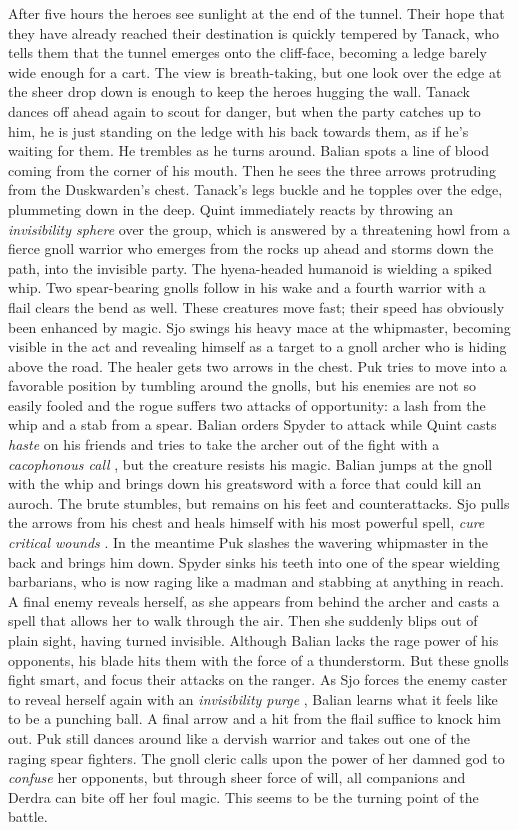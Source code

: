 After five hours the heroes see sunlight at the end of the tunnel. Their hope that they have already reached their destination is quickly tempered by Tanack, who tells them that the tunnel emerges onto the cliff-face, becoming a ledge barely wide enough for a cart. The view is breath-taking, but one look over the edge at the sheer drop down is enough to keep the heroes hugging the wall. Tanack dances off ahead again to scout for danger, but when the party catches up to him, he is just standing on the ledge with his back towards them, as if he's waiting for them. He trembles as he turns around. Balian spots a line of blood coming from the corner of his mouth. Then he sees the three arrows protruding from the Duskwarden's chest. Tanack's legs buckle and he topples over the edge, plummeting down in the deep. Quint immediately reacts by throwing an {\itshape invisibility sphere} over the group, which is answered by a threatening howl from a fierce gnoll warrior who emerges from the rocks up ahead and storms down the path, into the invisible party. The hyena-headed humanoid is wielding a spiked whip. Two spear-bearing gnolls follow in his wake and a fourth warrior with a flail clears the bend as well. These creatures move fast; their speed has obviously been enhanced by magic. Sjo swings his heavy mace at the whipmaster, becoming visible in the act and revealing himself as a target to a gnoll archer who is hiding above the road. The healer gets two arrows in the chest. Puk tries to move into a favorable position by tumbling around the gnolls, but his enemies are not so easily fooled and the rogue suffers two attacks of opportunity: a lash from the whip and a stab from a spear. Balian orders Spyder to attack while Quint casts  {\itshape haste} on his friends and tries to take the archer out of the fight with a  {\itshape cacophonous call} , but the creature resists his magic. Balian jumps at the gnoll with the whip and brings down his greatsword with a force that could kill an auroch. The brute stumbles, but remains on his feet and counterattacks. Sjo pulls the arrows from his chest and heals himself with his most powerful spell,  {\itshape cure critical wounds} . In the meantime Puk slashes the wavering whipmaster in the back and brings him down. Spyder sinks his teeth into one of the spear wielding barbarians, who is now raging like a madman and stabbing at anything in reach. A final enemy reveals herself, as she appears from behind the archer and casts a spell that allows her to walk through the air. Then she suddenly blips out of plain sight, having turned invisible. Although Balian lacks the rage power of his opponents, his blade hits them with the force of a thunderstorm. But these gnolls fight smart, and focus their attacks on the ranger. As Sjo forces the enemy caster to reveal herself again with an  {\itshape invisibility purge} , Balian learns what it feels like to be a punching ball. A final arrow and a hit from the flail suffice to knock him out. Puk still dances around like a dervish warrior and takes out one of the raging spear fighters. The gnoll cleric calls upon the power of her damned god to {\itshape confuse} her opponents, but through sheer force of will, all companions and Derdra can bite off her foul magic. This seems to be the turning point of the battle. 